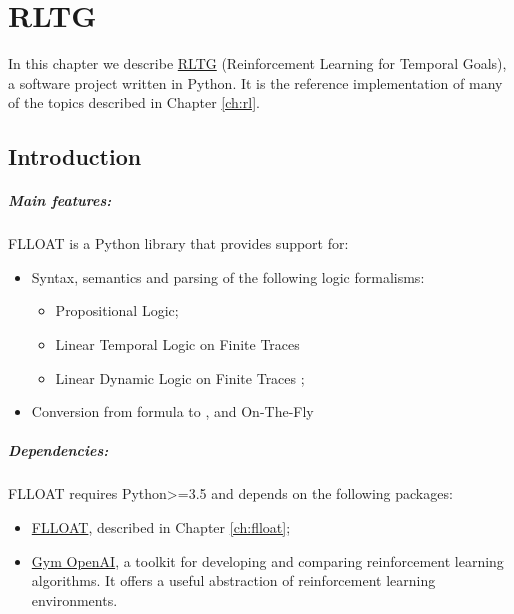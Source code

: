 \chapter{RLTG}\label{ch:rltg}
In this chapter we describe \href{https://github.com/MarcoFavorito/rltg.git}{RLTG} (Reinforcement Learning for Temporal Goals), a software project written in Python.  It is the reference implementation of many of the topics described in Chapter \ref{ch:rl}. 


\section{Introduction}
\paragraph{Main features:} FLLOAT is a Python library that provides support for:
\begin{itemize}
	
	\item Syntax, semantics and parsing of the following logic formalisms:
	\begin{itemize}
		\item Propositional Logic;
		\item Linear Temporal Logic on Finite Traces \LTLf
		\item Linear Dynamic Logic on Finite Traces \LDLf;
	\end{itemize}
	\item Conversion from \LLf formula to \NFA, \DFA and \DFA On-The-Fly
	
\end{itemize}

\paragraph{Dependencies:} FLLOAT requires Python>=3.5 and depends on the following packages:
\begin{itemize}
	\item \href{https://github.com/MarcoFavorito/flloat.git}{FLLOAT}, described in Chapter \ref{ch:flloat};
	\item \href{https://gym.openai.com/}{Gym OpenAI}, a toolkit for developing and comparing reinforcement learning algorithms. It offers a useful abstraction of reinforcement learning environments.
\end{itemize}

